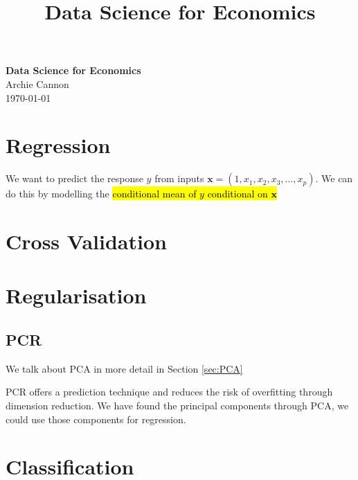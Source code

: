 \documentclass[11pt]{article}
\begin{document}
\title{Data Science for Economics}

\thispagestyle{empty}

\begin{center}
{\LARGE \bf Data Science for Economics}\\
{\large Archie Cannon}\\
\today
\end{center}

{
\begin{tcolorbox}[title=Contents, fonttitle=\huge\sffamily\bfseries\selectfont,interior style={left color=contcol1!50!white,right color=contcol2!50!white},frame style={left color=contcol1!80!white,right color=contcol2!80!white},coltitle=black,top=2mm,bottom=2mm,left=2mm,right=2mm,drop fuzzy shadow,enhanced,breakable]
\makeatletter
{}
\makeatother
\end{tcolorbox}}

\newpage

\section{Regression}

We want to predict the response $y$ from inputs $\mathbf{x} = (1, x_1, x_2, x_3, \ldots, x_p)$. We can do this by modelling the \hl{conditional mean of $y$ conditional on $\mathbf{x}$}

\section{Cross Validation}

\section{Regularisation}

\subsection{PCR}
We talk about PCA in more detail in Section \ref{sec:PCA}

PCR offers a prediction technique and reduces the risk of overfitting through dimension reduction. We have found the principal components through PCA, we could use those components for regression. 

\section{Classification}
\end{document}
